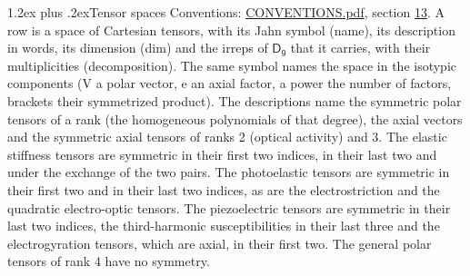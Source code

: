 \documentclass[10pt,a4paper]{article}
\makeatletter
\renewcommand\section{\@startsection{section}{1}{\z@}{-3ex plus -1ex minus -.2ex}%
  {1.2ex plus .2ex}{\normalfont\large\sffamily\bfseries\color{parttitle}}}
\numberwithin{equation}{section}
\newcommand{\grp}[1]{\mathsf{#1}}
\makeatother
\begin{document}
\section{Tensor spaces}\label{s:tensor_spaces}
Conventions: \href{../../CONVENTIONS.pdf}{CONVENTIONS.pdf}, section \href{../../CONVENTIONS.pdf\#conv.13}{13}.
\leavevmode\label{n:head.name}\label{n:head.description}\label{n:head.dim}\label{n:head.decomposition}A row is a space of Cartesian tensors, with its Jahn symbol (name), its description in words, its dimension (dim) and the irreps of $\grp{D_{9}}$ that it carries, with their multiplicities (decomposition). \label{n:label.jahn}The same symbol names the space in the isotypic components (V a polar vector, e an axial factor, a power the number of factors, brackets their symmetrized product). The descriptions name the symmetric polar tensors of a rank (the homogeneous polynomials of that degree), the axial vectors and the symmetric axial tensors of ranks 2 (optical activity) and 3. The elastic stiffness tensors are symmetric in their first two indices, in their last two and under the exchange of the two pairs. The photoelastic tensors are symmetric in their first two and in their last two indices, as are the electrostriction and the quadratic electro-optic tensors. The piezoelectric tensors are symmetric in their last two indices, the third-harmonic susceptibilities in their last three and the electrogyration tensors, which are axial, in their first two. The general polar tensors of rank 4 have no symmetry.
\end{document}
